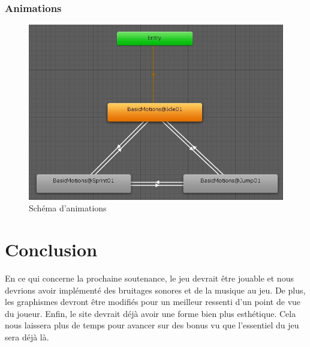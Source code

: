 \documentclass{article}
\begin{document}
\subsubsection{Animations}
\label{Animations}

\begin{figure}[h]
	\includegraphics[width=1\textwidth]{anim.jpg}
	\caption{Schéma d'animations}
\end{figure}


\section{Conclusion}

En ce qui concerne la prochaine soutenance, le jeu devrait être jouable et nous devrions avoir implémenté des bruitages sonores et de la musique au jeu. De plus, les graphismes devront être modifiés pour un meilleur ressenti d’un point de vue du joueur. Enfin, le site devrait déjà avoir une forme bien plus esthétique. Cela nous laissera plus de temps pour avancer sur des bonus vu que l'essentiel du jeu sera déjà là.

\newpage
\end{document}
